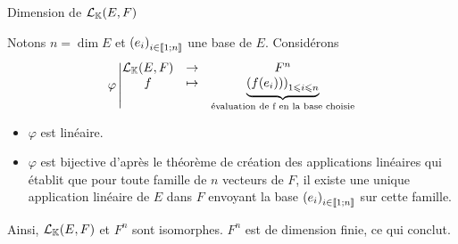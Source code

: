 \documentclass{article}
\begin{document}
	\begin{question_kholle}
		[$\mathcal{L}_\K(E,F)$ est dimension finie et
		\begin{equation}
			\dim \mathcal{L}_\K(E,F) = \dim E \times \dim F
		\end{equation}]
		{Dimension de $\mathcal{L}_\K(E,F)$}
		
		Notons $n = \dim E$ et $\left(e_i\right)_{i \in [\![ 1 ; n ]\!]}$ une base de $E$. Considérons
		\begin{equation*}
			\varphi
			\left| \begin{matrix}
				\mathcal{L}_{\mathbb K}(E,F) &\rightarrow& F^n \\
				f &\mapsto& \underbrace{\left(f(e_i))\right)_{1 \leqslant i \leqslant n}}_{\text{évaluation de f en la base choisie}}
			\end{matrix} \right.
		\end{equation*}
		
		\begin{itemize}[label=$*$]
			\item $\varphi$ est linéaire.
			\item $\varphi$ est bijective d'après le théorème de création des applications linéaires qui établit que pour toute famille de $n$ vecteurs de $F$, il existe une unique application linéaire de $E$ dans $F$ envoyant la base $\left(e_i\right)_{i \in [\![ 1 ; n ]\!]}$ sur cette famille.
		\end{itemize}
		
		Ainsi, $\mathcal{L}_\K(E,F)$ et $F^n$ sont isomorphes. $F^n$ est de dimension finie, ce qui conclut.
	\end{question_kholle}
	
\end{document}
